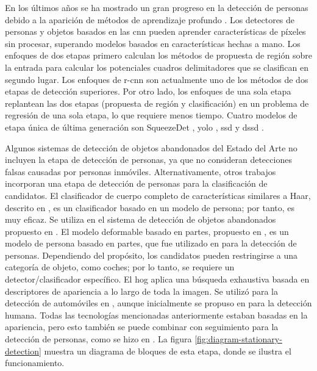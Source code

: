 En los últimos años se ha mostrado un gran progreso en la detección de personas debido a la aparición de métodos de aprendizaje profundo \cite{benenson2014years} \cite{zhang2016far} \cite{hosang2015taking}. Los detectores de personas y objetos basados en las \gls{cnn} pueden aprender características de píxeles sin procesar, superando modelos basados en características hechas a mano. Los enfoques de dos etapas primero calculan los métodos de propuesta de región sobre la entrada para calcular los potenciales cuadros delimitadores que se clasifican en segundo lugar. Los enfoques de \gls{r-cnn} \cite{girshick2014rich} \cite{ren2016faster} son actualmente uno de los métodos de dos etapas de detección superiores. Por otro lado, los enfoques de una sola etapa replantean las dos etapas (propuesta de región y clasificación) en un problema de regresión de una sola etapa, lo que requiere menos tiempo. Cuatro modelos de etapa única de última generación son SqueezeDet \cite{wu2019squeezedet}, \gls{yolo} \cite{redmon2016look}, \gls{ssd} \cite{Liu_2016} y \gls{dssd} \cite{fu2017dssd}.

Algunos sistemas de detección de objetos abandonados del Estado del Arte no incluyen la etapa de detección de personas, ya que no consideran detecciones falsas causadas por personas inmóviles. Alternativamente, otros trabajos incorporan una etapa de detección de personas para la clasificación de candidatos. El clasificador de cuerpo completo de características similares a Haar, descrito en \cite{990517}, es un clasificador basado en un modelo de persona; por tanto, es muy eficaz. Se utiliza en el sistema de detección de objetos abandonados propuesto en \cite{LIN2016181}. El modelo deformable basado en partes, propuesto en \cite{5255236}, es un modelo de persona basado en partes, que fue utilizado en \cite{7052354} para la detección de personas. Dependiendo del propósito, los candidatos pueden restringirse a una categoría de objeto, como coches; por lo tanto, se requiere un detector/clasificador específico. El \gls{hog} aplica una búsqueda exhaustiva basada en descriptores de apariencia a lo largo de toda la imagen. Se utilizó para la detección de automóviles en \cite{Wahyono2017CumulativeDF}, aunque inicialmente se propuso en \cite{1467360} para la detección humana. Todas las tecnologías mencionadas anteriormente estaban basadas en la apariencia, pero esto también se puede combinar con seguimiento para la detección de personas, como se hizo en \cite{5571035}. La figura \ref{fig:diagram-stationary-detection} muestra un diagrama de bloques de esta etapa, donde se ilustra el funcionamiento.

